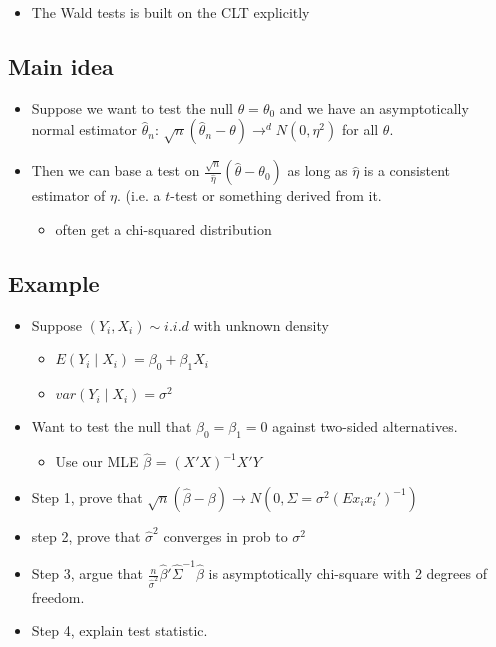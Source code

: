 \begin{itemize}
\item The Wald tests is built on the CLT explicitly
\end{itemize}
\subsection{Main idea}
\label{sec-2-1}

\begin{itemize}
\item Suppose we want to test the null $\theta = \theta_0$ and we have
      an asymptotically normal estimator $\hat\theta_n$: $\sqrt{n}
      (\hat\theta_n - \theta) \to^d N(0,\eta^2)$ for all $\theta$.
\item Then we can base a test on $\frac{\sqrt{n}}{\hat\eta}
      (\hat\theta - \theta_0)$ as long as $\hat\eta$ is a consistent
      estimator of $\eta$. (i.e. a $t$-test or something derived from it.
\begin{itemize}
\item often get a chi-squared distribution
\end{itemize}
\end{itemize}
\subsection{Example}
\label{sec-2-2}

\begin{itemize}
\item Suppose $(Y_i, X_i) \sim i.i.d$ with unknown density
\begin{itemize}
\item $E(Y_i \mid X_i) = \beta_0 + \beta_1 X_i$
\item $var(Y_i \mid X_i) = \sigma^2$
\end{itemize}
\item Want to test the null that $\beta_0 = \beta_1 = 0$ against
       two-sided alternatives.
\begin{itemize}
\item Use our MLE $\hat\beta$ = $(X'X)^{-1} X'Y$
\end{itemize}
\item Step 1, prove that $\sqrt{n}(\hat\beta - \beta) \to N(0, \Sigma = \sigma^2 (E x_i x_i')^{-1})$
\item step 2, prove that $\hat\sigma^2$ converges in prob to $\sigma^2$
\item Step 3, argue that $\frac{n}{\hat\sigma^2}
       \hat\beta'\hat\Sigma^{-1} \hat\beta$ is asymptotically
       chi-square with 2 degrees of freedom.
\item Step 4, explain test statistic.
\end{itemize}
